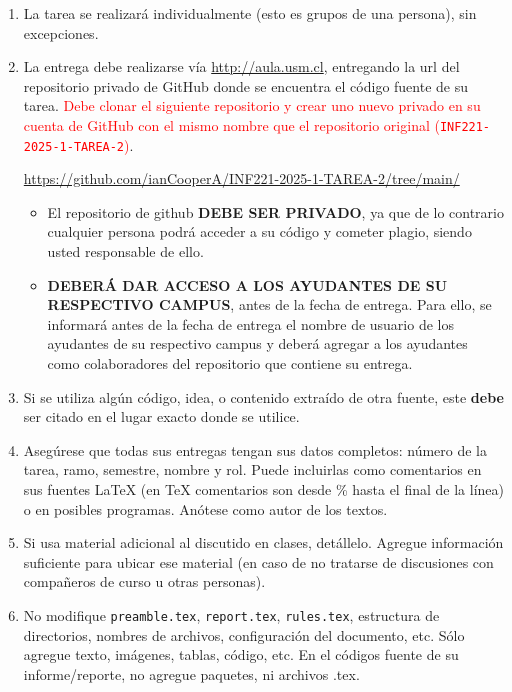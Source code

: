 
  \begin{enumerate}[(1)]
  \item
    La tarea se realizará individualmente
    (esto es grupos de una persona),
    sin excepciones.
  \item
    La entrega debe realizarse vía \url{http://aula.usm.cl}, entregando la url del repositorio privado de GitHub donde se encuentra el código fuente de su tarea. 
    \textcolor{red}{Debe clonar el siguiente repositorio y crear uno nuevo privado en su cuenta de GitHub con el mismo nombre que el repositorio original (\texttt{INF221-2025-1-TAREA-2})}.
    \begin{center}

      \url{https://github.com/ianCooperA/INF221-2025-1-TAREA-2/tree/main/}
          
  \end{center}

  \begin{itemize}
      
  \item El repositorio de github \textbf{DEBE SER PRIVADO}, ya que de lo contrario cualquier persona podrá acceder a su código y cometer plagio, siendo usted responsable de ello.
  \item  \textbf{DEBERÁ DAR ACCESO A LOS AYUDANTES DE SU RESPECTIVO CAMPUS}, antes de la fecha de entrega. Para ello, se informará antes de la fecha de entrega el nombre de usuario de los ayudantes de su respectivo campus y deberá agregar a los ayudantes como colaboradores del repositorio que contiene su entrega. 
  \end{itemize}

  \item Si se utiliza algún código, idea, o contenido extraído de otra fuente, este \textbf{debe} ser citado en el lugar exacto donde se utilice. 
  \item
  Asegúrese que todas sus entregas tengan sus datos completos:
  número de la tarea, ramo, semestre, nombre y rol.
  Puede incluirlas como comentarios en sus fuentes \LaTeX{}
  (en \TeX{} comentarios son desde \% hasta el final de la línea)
  o en posibles programas.
  Anótese como autor de los textos.

  \item
    Si usa material adicional al discutido en clases,
    detállelo.
    Agregue información suficiente para ubicar ese material
    (en caso de no tratarse de discusiones con compañeros de curso
     u otras personas).
    \item No modifique \texttt{preamble.tex}, \texttt{report.tex}, \texttt{rules.tex}, estructura de directorios, nombres de archivos, configuración del documento, etc. Sólo agregue texto, imágenes, tablas, código, etc. En el códigos fuente de su informe/reporte, no agregue paquetes, ni archivos .tex.


\end{enumerate}
